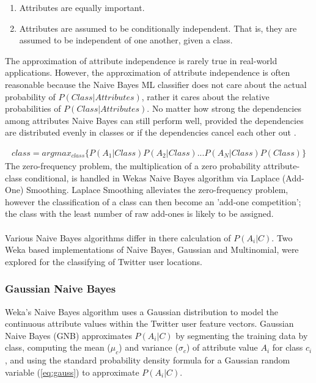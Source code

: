 \documentclass[11pt]{article}
\begin{document}
\begin{enumerate}
\item Attributes are equally important.
\item Attributes are assumed to be conditionally independent. That is, they are assumed to be independent of one another, given a class.
\end{enumerate}   
The approximation of attribute independence is rarely true in real-world applications. However, the approximation of attribute independence is often reasonable because the Naive Bayes ML classifier does not care about the actual probability of $P(Class|Attributes)$, rather it cares about the relative probabilities of $P(Class|Attributes)$. No matter how strong the dependencies among attributes Naive Bayes can still perform well, provided the dependencies are distributed evenly in classes or if the dependencies cancel each other out \cite{zhang-naive}. 

\begin{gather*}
class = argmax_{class}\{P(A_1|Class)P(A_2|Class)...P(A_N|Class)P(Class)\}
\tag{2}\label{eq:naive}
\end{gather*}
The zero-frequency problem, the multiplication of a zero probability attribute-class conditional, is handled in Wekas Naive Bayes algorithm via Laplace (Add-One) Smoothing. Laplace Smoothing alleviates the zero-frequency problem, however the classification of a class can then become an 'add-one competition'; the class with the least number of raw add-ones is likely to be assigned.\\\\
Various Naive Bayes algorithms differ in there calculation of $P(A_i|C)$. Two Weka based implementations of Naive Bayes, Gaussian and Multinomial, were explored for the classifying of Twitter user locations.

\subsubsection{Gaussian Naive Bayes}
\label{subsubsect:GNB}

Weka's Naive Bayes algorithm uses a Gaussian distribution to model the continuous attribute values within the Twitter user feature vectors. Gaussian Naive Bayes (GNB) approximates $P(A_i|C)$ by segmenting the training data by class, computing the mean ($\mu_c$) and variance ($\sigma_c$) of attribute value $A_i$ for class $c_i$, and using the standard probability density formula for a Gaussian random variable (\ref{eq:gauss}) to approximate $P(A_i|C)$.
\end{document}
